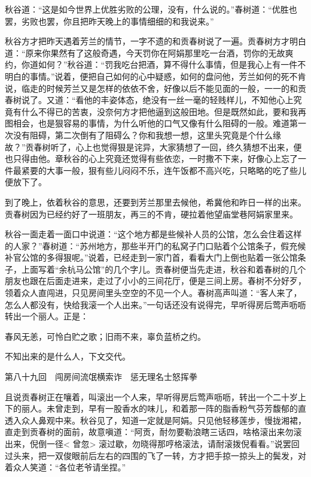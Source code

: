 \documentclass[12pt,UTF8]{ctexbook}
\begin{document}
{{{秋谷道：“这是如今世界上优胜劣败的公理，没有，什么说的。”春树道：“优胜也罢，劣败也罢，你且把昨天晚上的事情细细的和我说来。”

秋谷方才把昨天遇着芳兰的情节，一字不遗的和贡春树说了一遍。贡春树方才明白道：“原来你果然有了这般奇遇，今天罚你在阿娟那里吃一台酒，罚你的无故爽约，你道如何？”秋谷道：“罚我吃台把酒，算不得什么事情，但是我心上有一件不明白的事情。”说着，便把自己如何的心中疑惑，如何的盘问他，芳兰如何的死不肯说，临走的时候芳兰又是怎样的依依不舍，好像以后不能见面的一般，一一的和贡春树说了。又道：“看他的丰姿体态，绝没有一丝一毫的轻贱样儿，不知他心上究竟有什么不得已的苦衷，没奈何方才把他逼到这般田地。但是既然如此，要和我再图相会，也是狠容易的事情，为什么听他的口气又像有什么阻碍的一般。难道第一次没有阻碍，第二次倒有了阻碍么？你和我想一想，这里头究竟是个什么缘故？”贡春树听了，心上也觉得狠是诧异，大家猜想了一回，终久猜想不出来，便也只得由他。章秋谷的心上究竟还觉得有些依恋，一时撒不下来，好像心上忘了一件最紧要的大事一般，狠有些儿闷闷不乐，连午饭都不高兴吃，只略略的吃了些儿便放下了。

到了晚上，依着秋谷的意思，还要到芳兰那里去候他，希冀他和昨日一样的出来。贡春树因为已经约好了一班朋友，再三的不肯，硬拉着他望庙堂巷阿娟家里来。

秋谷一面走着一面口中说道：“这个地方都是些候补人员的公馆，怎么会住着这样的人家？”春树道：“苏州地方，那些半开门的私窝子门口贴着个公馆条子，假充候补官公馆的多得狠呢。”说着，已经走到一家门首，看看大门上倒也贴着一张公馆条子，上面写着“余杭马公馆”的几个字儿。贡春树便当先走进，秋谷和着春树的几个朋友也跟在后面走进来，走过了小小的三间花厅，便是三间上房。春树不分好歹，领着众人直闯进，只见房间里头空空的不见一个人。春树高声叫道：“客人来了，怎么人都没有，快给我滚一个人出来。”一句话还没有说得完，早听得房后莺声呖呖转出一个丽人。正是：

春风无恙，可怜白贮之歌；旧雨不来，辜负蓝桥之约。

不知出来的是什么人，下文交代。





第八十九回　闯房间流氓横索诈　惩无理名士怒挥拳



且说贡春树正在嚷着，叫滚出一个人来，早听得房后莺声呖呖，转出一个二十岁上下的丽人。未曾走到，早有一股香水的味儿，和着那一阵的脂香粉气芬芳馥郁的直透入众人鼻观中来。秋谷见了，知道一定就是阿娟。只见他轻移莲步，慢拢湘裙，直走到贡春树的面前，故意嗔道：“阿贡，耐勿要勒浪瞎三话四，啥格滚出来勿滚出来，倪倒一径< 曾忽> 滚过歇，勿晓得那哼格滚法，请耐滚拨倪看看。”说罢回过头来，把一双俊眼前后左右的四围的飞了一转，方才把手掠一掠头上的鬓发，对着众人笑道：“各位老爷请坐捏。”

}}}
\end{document}
